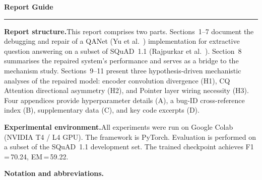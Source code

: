 \documentclass[10pt]{article}
\begin{document}
\newpage

\thispagestyle{fancy}
\vspace*{0.5cm}
\tableofcontents
\newpage

\thispagestyle{fancy}
\vspace*{0.5cm}
\begin{center}
{\bfseries\fontsize{18}{22}\selectfont Report Guide\par}
\vspace{0.5em}
{\color{SectionRule}\rule{0.5\linewidth}{0.6pt}\par}
\end{center}

\vspace{1em}

\textbf{Report structure.}\quad This report comprises two parts. Sections~1--7 document the debugging and repair of a QANet (Yu et al.~\cite{yu2018qanet}) implementation for extractive question answering on a subset of SQuAD~1.1 (Rajpurkar et al.~\cite{rajpurkar2016squad}). Section~8 summarises the repaired system's performance and serves as a bridge to the mechanism study. Sections~9--11 present three hypothesis-driven mechanistic analyses of the repaired model: encoder convolution divergence (H1), CQ Attention directional asymmetry (H2), and Pointer layer wiring necessity (H3). Four appendices provide hyperparameter details (A), a bug-ID cross-reference index (B), supplementary data (C), and key code excerpts (D).

\vspace{0.6em}

\textbf{Experimental environment.}\quad All experiments were run on Google Colab (NVIDIA T4 / L4 GPU). The framework is PyTorch. Evaluation is performed on a subset of the SQuAD~1.1 development set. The trained checkpoint achieves F1\,=\,70.24, EM\,=\,59.22.

\vspace{0.6em}

\textbf{Notation and abbreviations.}
\end{document}
